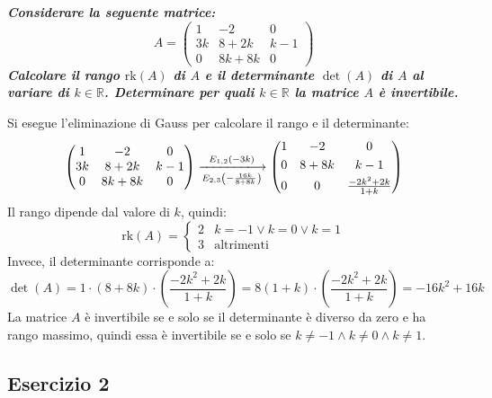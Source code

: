 \documentclass[a4paper]{article}
\makeatletter
\newenvironment{rowequmat}[1]{\left(\array{@{}#1@{}}}{\endarray\right)}
\makeatother
\begin{document}
	\textcolor{Green4}{\textbf{\emph{Considerare la seguente matrice:}}
	\begin{equation*}
		A = \begin{pmatrix}
			1	& -2	& 0		\\
			3k	& 8+2k	& k-1	\\
			0	& 8k+8k	& 0
		\end{pmatrix}
	\end{equation*}
	\textbf{\emph{Calcolare il rango $\mathrm{rk}\left(A\right)$ di $A$ e il determinante $\det\left(A\right)$ di $A$ al variare di $k \in \mathbb{R}$. Determinare per quali $k \in \mathbb{R}$ la matrice $A$ è invertibile.}}}\newline

	\noindent
	Si esegue l'eliminazione di Gauss per calcolare il rango e il determinante:
	\begin{equation*}
		\begin{pmatrix}
			1	& -2	& 0		\\
			3k	& 8+2k	& k-1	\\
			0	& 8k+8k	& 0
		\end{pmatrix}
		\xlongrightarrow[E_{2,3}\left(-\frac{16k}{8+8k}\right)]{E_{1,2}\left(-3k\right)}
		\begin{rowequmat}{ccc}
			1	& -2	& 0		\\ [.3em]
			0	& 8+8k	& k-1	\\ [.3em]
			0	& 0		& \frac{-2k^{2}+2k}{1+k}
		\end{rowequmat}
	\end{equation*}
	Il rango dipende dal valore di $k$, quindi:
	\begin{equation*}
		\mathrm{rk}\left(A\right) = \begin{cases}
			2 & k = -1 \lor k = 0 \lor k = 1 \\
			3 & \text{altrimenti}
		\end{cases}
	\end{equation*}
	Invece, il determinante corrisponde a:
	\begin{equation*}
		\det\left(A\right) = 1 \cdot \left(8+8k\right) \cdot \left(\dfrac{-2k^{2}+2k}{1+k}\right) = 8\left(1+k\right) \cdot \left(\dfrac{-2k^{2}+2k}{1+k}\right) = -16k^{2} + 16k
	\end{equation*}
	La matrice $A$ è invertibile se e solo se il determinante è diverso da zero e ha rango massimo, quindi essa è invertibile se e solo se $k \ne -1 \land k \ne 0 \land k \ne 1$.\newpage

	\subsection{Esercizio 2}
\end{document}

